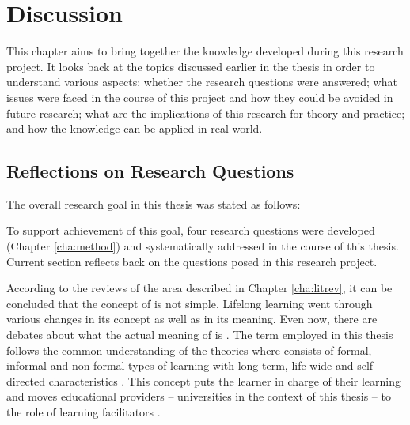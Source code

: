 \chapter{Discussion\label{cha:discussion}}
This chapter aims to bring together the knowledge developed during this research
project. It looks back at the topics discussed earlier in the thesis in order to
understand various aspects: whether the research questions were answered; what
issues were faced in the course of this project and how they could be avoided in
future research; what are the implications of this research for theory and
practice; and how the knowledge can be applied in real world.

\section{Reflections on Research Questions}

The overall research goal in this thesis was stated as follows:


To support achievement of this goal, four research questions were developed
(Chapter \ref{cha:method}) and systematically addressed in the course of this
thesis. Current section reflects back on the questions posed in this research
project.


According to the reviews of the area described in Chapter \ref{cha:litrev}, it
can be concluded that the concept of \LLLs is not simple. Lifelong learning
went through various changes in its concept as well as in its meaning. Even now,
there are debates about what the actual meaning of \LLLs is \citep{Griffin2002}.
The term employed in this thesis follows the common understanding of the
theories where \LLLs consists of formal, informal and non-formal types of
learning with long-term, life-wide and self-directed characteristics
\citep{Longworth2003,Rubenson2002,Schuetze2006}. This concept puts the learner
in charge of their learning and moves educational providers -- universities in
the context of this thesis -- to the role of learning facilitators
\citep{Boshier2000}.

